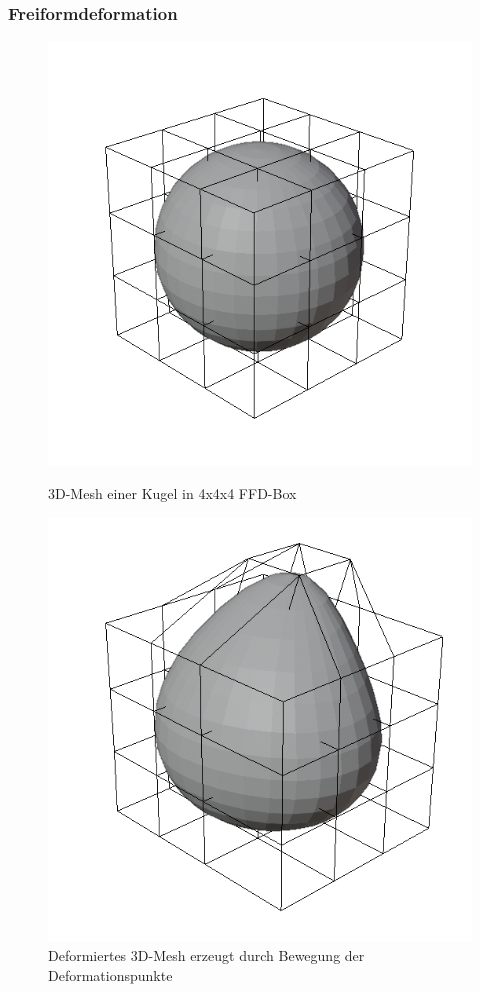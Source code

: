 \subsubsection{Freiformdeformation}
\label{sub:ffd}
\begin{figure}[h]
	\centering
	\begin{minipage}{0.45\textwidth}
		\centering
		\includegraphics[width=1\linewidth]{bilder/sphere_lattice}
		\caption{3D-Mesh einer Kugel in 4x4x4 FFD-Box}
		\label{fig:ffd_undeformed}
	\end{minipage}\hfill
	\begin{minipage}{0.45\textwidth}
		\centering
		\includegraphics[width=1\linewidth]{bilder/sphere_lattice_deformed2}
		\caption{Deformiertes 3D-Mesh erzeugt durch Bewegung der Deformationspunkte}
		\label{fig:ffd_deformed}
	\end{minipage}
\end{figure}
